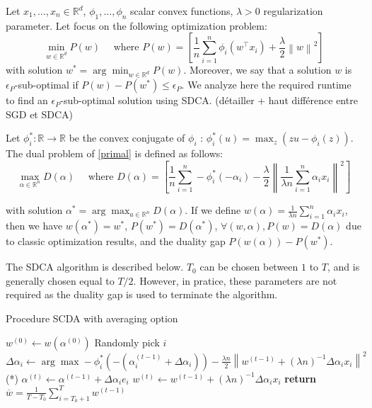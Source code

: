 \documentclass{article}
\newcommand{\norm}[1]{\left\|#1 \right\|}
\begin{document}
Let $x_1, \dots, x_n \in \mathbb{R}^d$, $\phi_1, \dots, \phi_n$ scalar convex functions, $\lambda > 0$ regularization parameter.
Let focus on the following optimization problem:
\begin{equation}
    \min_{w \in \mathbb{R}^d} P(w) \quad \text{ where } P(w) = \left[ \dfrac{1}{n} \sum_{i=1}^n \phi_i(w^\top x_i) + \dfrac{\lambda}{2}\norm{w}^2 \right]
    \label{primal}
\end{equation}
with solution $w^{*} = \arg \min_{w \in \mathbb{R}^d} P(w)$.
Moreover, we say that a solution $w$ is $\epsilon_P$-sub-optimal if $P(w) - P(w^{*}) \leq \epsilon_P$.
We analyze here the required runtime to find an $\epsilon_P$-sub-optimal solution using SDCA. (détailler + haut différence entre SGD et SDCA)

Let $\phi_i^{*} : \mathbb{R} \rightarrow \mathbb{R}$ be the convex conjugate of $\phi_i$ : $\phi_i^{*}(u) = \max_z (zu-\phi_i(z))$.
The dual problem of \eqref{primal} is defined as follows:
\begin{equation}
    \max_{\alpha \in \mathbb{R}^n} D(\alpha) \quad \text{ where } D(\alpha) = \left[ \dfrac{1}{n} \sum_{i=1}^n -\phi_i^{*}(-\alpha_i) - \dfrac{\lambda}{2}\norm{\dfrac{1}{\lambda n}\sum_{i=1}^n \alpha_ix_i}^2 \right]
    \label{dual}
\end{equation}

with solution $\alpha^{*} = \arg \max_{a \in \mathbb{R}^n} D(\alpha)$.
If we define $w(\alpha) = \frac{1}{\lambda n} \sum_{i=1}^n \alpha_ix_i$, then we have $w(\alpha^{*}) = w^{*}$, $P(w^{*}) = D(\alpha^{*})$, $\forall (w,\alpha), P(w) = D(\alpha)$ due to classic optimization results, and the duality gap $P(w(\alpha)) - P(w^{*})$.

The SDCA algorithm is described below.
$T_0$ can be chosen between $1$ to $T$, and is generally chosen equal to $T/2$.
However, in pratice, these parameters are not required as the duality gap is used to terminate the algorithm.

\begin{algorithm}
\caption{Procedure SCDA with averaging option}
\begin{algorithmic}
\State $w^{(0)} \gets w(\alpha^{(0)})$
\State Randomly pick $i$
\State $\Delta \alpha_i \gets \arg \max -\phi^{*}_i(-(\alpha_i^{(t-1)}+\Delta \alpha_i))-\frac{\lambda n}{2}\norm{w^{(t-1)}+(\lambda n)^{-1}\Delta \alpha_i x_i}^2$ \qquad \qquad \qquad \qquad \qquad (*)
\State $\alpha^{(t)} \gets \alpha^{(t-1)} + \Delta \alpha_i e_i$
\State $w^{(t)} \gets w^{(t-1)} + (\lambda n)^{-1} \Delta \alpha_i x_i$
\EndFor
\State \textbf{return} $\overline{w} = \frac{1}{T-T_0} \sum_{i = T_0+1}^T w^{(t-1)}$
\EndProcedure
\end{algorithmic}
\end{algorithm}
\end{document}
